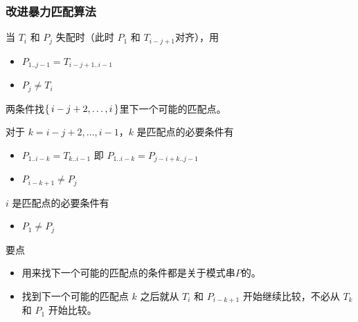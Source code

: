 \documentclass{ctexbeamer}
\begin{document}
\begin{frame}[fragile]
\frametitle{改进暴力匹配算法}


当 $T_i$ 和 $P_j$ 失配时（此时 $P_1$ 和 $T_{i - j + 1}$对齐），用
\begin{itemize}
\item $P_{1..j-1} = T_{i - j + 1..i-1}$
\item $P_j \ne T_i$
\end{itemize}
两条件找$\set{i - j + 2, \dots, i}$里下一个可能的匹配点。

\begin{block}{}
对于 $k = i - j + 2, \dots, i - 1$，$k$ 是匹配点的必要条件有
\begin{itemize}
\item $P_{1..i-k} = T_{k..i-1} $ 即 $P_{1..i-k} = P_{j - i+k ..j - 1}$
\item $P_{i - k + 1} \ne P_j$
\end{itemize}

$i$ 是匹配点的必要条件有
\begin{itemize}
\item $P_1 \ne P_j$
\end{itemize}

\end{block}


\begin{block}{要点}
\begin{itemize}
\item 用来找下一个可能的匹配点的条件都是关于模式串$P$的。
\item 找到下一个可能的匹配点 $k$ 之后就从 $T_i$ 和 $P_{i - k + 1}$ 开始继续比较，不必从 $T_k$ 和 $P_1$ 开始比较。
\end{itemize}
\end{block}



\end{frame}
\end{document}
